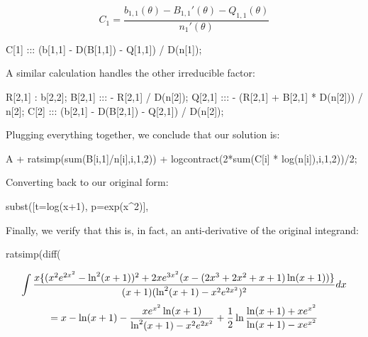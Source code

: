 $$ C_1 = \frac{b_{1,1}(\theta) - B_{1,1}'(\theta) - Q_{1,1}(\theta)}{n_1'(\theta)} $$

\begin{maximacode}
C[1] :::
   (b[1,1] - D(B[1,1]) - Q[1,1]) / D(n[1]);
\end{maximacode}

A similar calculation handles the other irreducible factor:

\begin{maximacode}
R[2,1] : b[2,2];
B[2,1] ::: - R[2,1] / D(n[2]);
Q[2,1] :::
   - (R[2,1] + B[2,1] * D(n[2])) / n[2];
C[2] :::
   (b[2,1] - D(B[2,1]) - Q[2,1]) / D(n[2]);
\end{maximacode}

Plugging everything together, we conclude that our solution is:

\begin{maximacode}
A + ratsimp(sum(B[i,1]/n[i],i,1,2))
   + logcontract(2*sum(C[i] * log(n[i]),i,1,2))/2;
\end{maximacode}

\begin{comment}
\begin{multline*}
\int{{x\{(x^2 \psi^2-\theta^2)^2+2x \psi^3(x-(2x^3+2x^2+x+1)\theta)\}}\over{(x+1)(\theta^2 - x^2\psi^2)^2}} dx \\
= x - \theta -\frac{\frac{x}{2}\psi}{\theta + x \psi} - \frac{\frac{x}{2}\psi}{\theta - x \psi} + \frac{1}{2}\ln(\theta + x\psi)- \frac{1}{2}\ln(\theta - x \psi)
\end{multline*}

$$ = x - \theta -\frac{x \psi \theta}{\theta^2 - x^2 \psi^2} + \frac{1}{2}\ln\frac{\theta + x\psi}{\theta - x \psi}$$
\end{comment}

Converting back to our original form:

\begin{maximacode}
subst([t=log(x+1), p=exp(x^2)], %
\end{maximacode}

Finally, we verify that this is, in fact,
an anti-derivative of the original integrand:

\begin{maximacode}
ratsimp(diff(%
\end{maximacode}

$$\int{{x\{(x^2e^{2x^2}-\ln^2(x+1))^2+2xe^{3x^2}(x-(2x^3+2x^2+x+1)\ln(x+1))\}}\over{(x+1)(\ln^2(x+1) - x^2e^{2x^2})^2}} dx$$
$$= x - \ln(x+1) - {x e^{x^2}\ln(x+1)\over{\ln^2(x+1)-x^2 e^{2x^2}}}
+ {1\over2}\ln\frac{\ln(x+1) + x e^{x^2}}{\ln(x+1) - x e^{x^2}}$$

